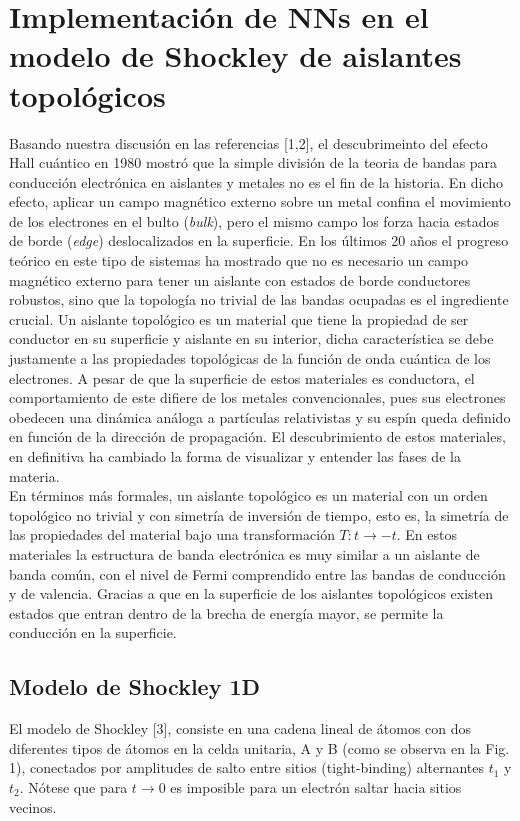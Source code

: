 \documentclass{article}
\begin{document}
\section{Implementación de NNs en el modelo de Shockley de aislantes topológicos}
Basando nuestra discusión en las referencias [1,2], el descubrimeinto del efecto Hall cuántico en 1980 mostró que la simple división de la teoria de bandas para conducción electrónica en aislantes y metales no es el fin de la historia. En dicho efecto, aplicar un campo magnético externo sobre un metal confina el movimiento de los electrones en el bulto (\textit{bulk}), pero el mismo campo los forza hacia estados de borde (\textit{edge}) deslocalizados en la superficie. En los últimos 20 años el progreso teórico en este tipo de sistemas ha mostrado que no es necesario un campo magnético externo para tener un aislante con estados de borde conductores robustos, sino que la topología no trivial de las bandas ocupadas es el ingrediente crucial. Un aislante topológico es un material que tiene la propiedad de ser conductor en su superficie y aislante en su interior, dicha característica se debe justamente a las propiedades topológicas de la función de onda cuántica de los electrones. A pesar de que la superficie de estos materiales es conductora, el comportamiento de este difiere de los metales convencionales, pues sus electrones obedecen una dinámica análoga a partículas relativistas y su espín queda definido en función de la dirección de propagación. El descubrimiento de estos materiales, en definitiva ha cambiado la forma de visualizar y entender las fases de la materia.\\

En términos más formales, un aislante topológico es un material con un orden topológico no trivial y con simetría de inversión de tiempo, esto es, la simetría de las propiedades del material bajo una transformación $T:t\rightarrow -t$. En estos materiales la estructura de banda electrónica es muy similar a un aislante de banda común, con el nivel de Fermi comprendido entre las bandas de conducción y de valencia. Gracias a que en la superficie de los aislantes topológicos existen estados que entran dentro de la brecha de energía mayor, se permite la conducción en la superficie. 

\subsection{Modelo de Shockley 1D}
El modelo de Shockley [3], consiste en una cadena lineal de átomos con dos diferentes tipos de átomos en la celda unitaria, A y B (como se observa en la Fig. 1), conectados por amplitudes de salto entre sitios (tight-binding) alternantes $t_1$ y $t_2$. Nótese que para $t\rightarrow 0$ es imposible para un electrón saltar hacia sitios vecinos.\\
\end{document}
